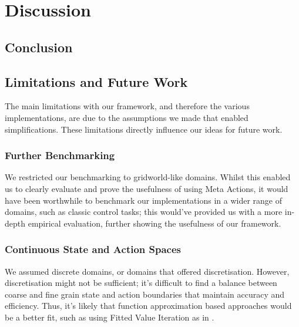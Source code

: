 \chapter{Discussion}
\label{chapter5}


\section{Conclusion}

\section{Limitations and Future Work}
The main limitations with our framework, and therefore the various implementations, are due to the assumptions we made that enabled simplifications. These limitations directly influence our ideas for future work.
\subsection{Further Benchmarking}
We restricted our benchmarking to gridworld-like domains. Whilst this enabled us to clearly evaluate and prove the usefulness of using Meta Actions, it would have been worthwhile to benchmark our implementations in a wider range of domains, such as classic control tasks; this would've provided us with a more in-depth empirical evaluation, further showing the usefulness of our framework.
\subsection{Continuous State and Action Spaces}
We assumed discrete domains, or domains that offered discretisation. However, discretisation might not be sufficient; it's difficult to find a balance between coarse and fine grain state and action boundaries that maintain accuracy and efficiency. Thus, it's likely that function approximation based approaches would be a better fit, such as using Fitted Value Iteration as in \cite{SARA07-jong}.
